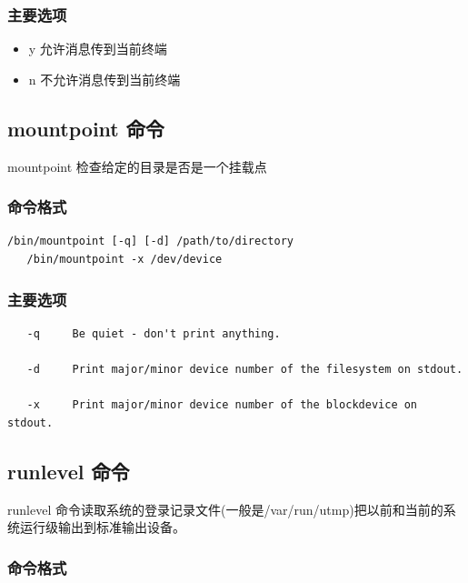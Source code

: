\subsubsection{主要选项}

\begin{itemize}
\item
  y 允许消息传到当前终端
\item
  n 不允许消息传到当前终端
\end{itemize}
\subsection{mountpoint 命令}

mountpoint 检查给定的目录是否是一个挂载点

\subsubsection{命令格式}

{\begin{shaded}\begin{verbatim}
/bin/mountpoint [-q] [-d] /path/to/directory
   /bin/mountpoint -x /dev/device
\end{verbatim}\end{shaded}}
\subsubsection{主要选项}

{\begin{shaded}\begin{verbatim}
   -q     Be quiet - don't print anything.

   -d     Print major/minor device number of the filesystem on stdout.

   -x     Print major/minor device number of the blockdevice on stdout.
\end{verbatim}\end{shaded}}
\subsection{runlevel 命令}

runlevel
命令读取系统的登录记录文件(一般是/var/run/utmp)把以前和当前的系统运行级输出到标准输出设备。

\subsubsection{命令格式}

